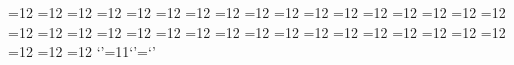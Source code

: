=12 %
{}=12 %
{}=12 %
{}=12 %
{}=12 %
{}=12 %
{}=12 %
{}=12 %
{}=12 %
{}=12 %
{}=12 %
{}=12 %
{}=12 %
{}=12 %
{}=12 %
{}=12 %
{}=12 %
{}=12 %
{}=12 %
{}=12 %
{}=12 %
{}=12 %
{}=12 %
{}=12 %
{}=12 %
{}=12 %
{}=12 %
{}=12 %
{}=12 %
{}=12 %
{}=12 %
{}=12 %
{}=12 %
{}=12 %
{}=12 %
{}=12 %
{}=12 %
\catcode`'=11\lccode`'=`'
                              
                                 
         